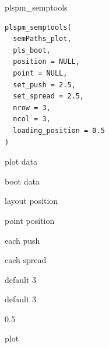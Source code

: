\documentclass[a4paper]{book}
\begin{document}
%
\begin{Description}
plspm\_semptools
\end{Description}
%
\begin{Usage}
\begin{verbatim}
plspm_semptools(
  semPaths_plot,
  pls_boot,
  position = NULL,
  point = NULL,
  set_push = 2.5,
  set_spread = 2.5,
  nrow = 3,
  ncol = 3,
  loading_position = 0.5
)
\end{verbatim}
\end{Usage}
%
\begin{Arguments}
\begin{ldescription}
\item[\code{semPaths\_plot}] plot data

\item[\code{pls\_boot}] boot data

\item[\code{position}] layout  position

\item[\code{point}] point position

\item[\code{set\_push}] each push

\item[\code{set\_spread}] each spread

\item[\code{nrow}] default 3

\item[\code{ncol}] default 3

\item[\code{loading\_position}] 0.5
\end{ldescription}
\end{Arguments}
%
\begin{Value}
plot
\end{Value}
%
\end{document}
